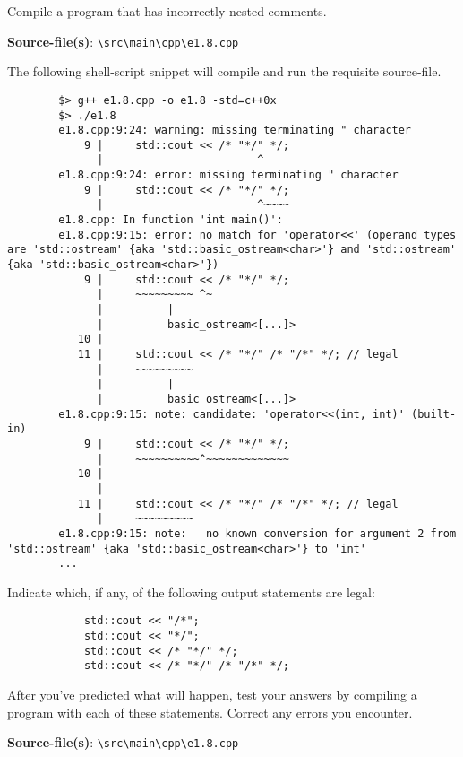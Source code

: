 \documentclass[12pt, a4paper]{article}
\begin{document}
    \bigskip
    \begin{tcolorbox}[title={Exercise: 1.7}]
        Compile a program that has incorrectly nested comments.
    \end{tcolorbox}
    \noindent\textbf{Source-file(s)}: \texttt{\textbackslash src\textbackslash main\textbackslash cpp\textbackslash e1.8.cpp}

    \noindent The following shell-script snippet will compile and run the requisite source-file.
    \begin{verbatim}
        $> g++ e1.8.cpp -o e1.8 -std=c++0x
        $> ./e1.8
        e1.8.cpp:9:24: warning: missing terminating " character
            9 |     std::cout << /* "*/" */;
              |                        ^
        e1.8.cpp:9:24: error: missing terminating " character
            9 |     std::cout << /* "*/" */;
              |                        ^~~~~
        e1.8.cpp: In function 'int main()':
        e1.8.cpp:9:15: error: no match for 'operator<<' (operand types are 'std::ostream' {aka 'std::basic_ostream<char>'} and 'std::ostream' {aka 'std::basic_ostream<char>'})
            9 |     std::cout << /* "*/" */;
              |     ~~~~~~~~~ ^~
              |          |
              |          basic_ostream<[...]>
           10 |
           11 |     std::cout << /* "*/" /* "/*" */; // legal
              |     ~~~~~~~~~
              |          |
              |          basic_ostream<[...]>
        e1.8.cpp:9:15: note: candidate: 'operator<<(int, int)' (built-in)
            9 |     std::cout << /* "*/" */;
              |     ~~~~~~~~~~^~~~~~~~~~~~~~
           10 |
              |
           11 |     std::cout << /* "*/" /* "/*" */; // legal
              |     ~~~~~~~~~
        e1.8.cpp:9:15: note:   no known conversion for argument 2 from 'std::ostream' {aka 'std::basic_ostream<char>'} to 'int'
        ...
    \end{verbatim}

    \bigskip
    \begin{tcolorbox}[title={Exercise: 1.8}]
        Indicate which, if any, of the following output statements are legal:
        \begin{verbatim}
            std::cout << "/*";
            std::cout << "*/";
            std::cout << /* "*/" */;
            std::cout << /* "*/" /* "/*" */;
        \end{verbatim}
        After you've predicted what will happen, test your answers by compiling a program with each of these statements.
        Correct any errors you encounter.
    \end{tcolorbox}
    \noindent\textbf{Source-file(s)}: \texttt{\textbackslash src\textbackslash main\textbackslash cpp\textbackslash e1.8.cpp}
\end{document}
